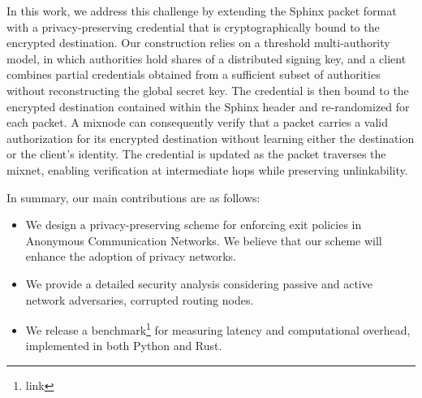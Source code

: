 In this work, we address this challenge by extending the Sphinx packet format with a privacy-preserving credential that is cryptographically bound to the encrypted destination. Our construction relies on a threshold multi-authority model, in which authorities hold shares of a distributed signing key, and a client combines partial credentials obtained from a sufficient subset of authorities without reconstructing the global secret key. The credential is then bound to the encrypted destination contained within the Sphinx header and re-randomized for each packet. A mixnode can consequently verify that a packet carries a valid authorization for its encrypted destination without learning either the destination or the client's identity. The credential is updated as the packet traverses the mixnet, enabling verification at intermediate hops while preserving unlinkability.


In summary, our main contributions are as follows:

\begin{itemize}
	
	\item We design a privacy-preserving scheme for enforcing exit policies in Anonymous Communication Networks. We believe that our scheme will enhance the adoption of privacy networks.
	
	\item We provide a detailed security analysis considering passive and active network adversaries, corrupted routing nodes.
	
	\item We release a benchmark\footnote{link} for measuring latency and computational overhead, implemented in both Python and Rust.
	
\end{itemize}